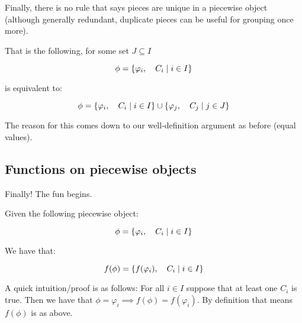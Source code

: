 \begin{theorem}
    Finally, there is no rule that says pieces are unique in a piecewise object (although generally redundant, duplicate pieces can be useful for grouping once more).

    That is the following, for some set $J\subseteq I$

    $$
        \phi=\{\varphi_i,\quad C_i\mid i\in I\}
    $$

    is equivalent to:

    $$
        \phi=\{\varphi_i,\quad C_i\mid i\in I\}\cup\{\varphi_j,\quad C_j\mid j\in J\}
    $$

    The reason for this comes down to our well-definition argument as before (equal values).
\end{theorem}
\subsection{Functions on piecewise objects}
Finally! The fun begins.
\begin{theorem}
    Given the following piecewise object:
    
    $$
        \phi = \{\varphi_i,\quad C_i\mid i\in I\}
    $$

    We have that:

    $$
        f(\phi) = \{f(\varphi_i),\quad C_i\mid i\in I\}
    $$
    
    A quick intuition/proof is as follows: For all $i\in I$ suppose that at least one $C_i$ is true. Then we have that $\phi=\varphi_i\implies f(\phi)=f(\varphi_i)$. By definition that means $f(\phi)$ is as above.
\end{theorem}
\newpage{}